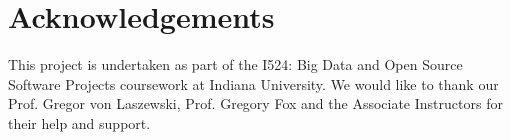 \documentclass[9pt,twocolumn,twoside]{../../styles/osajnl}
\begin{document}
\section{Acknowledgements}

This project is undertaken as part of the I524: Big Data and Open
Source Software Projects coursework at Indiana University. We would
like to thank our Prof. Gregor von Laszewski, Prof. Gregory Fox and
the Associate Instructors for their help and support.


\end{document}
